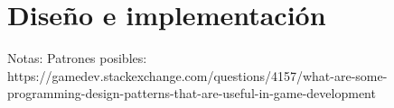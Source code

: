 \chapter{Diseño e implementación}



Notas: Patrones posibles: https://gamedev.stackexchange.com/questions/4157/what-are-some-programming-design-patterns-that-are-useful-in-game-development

